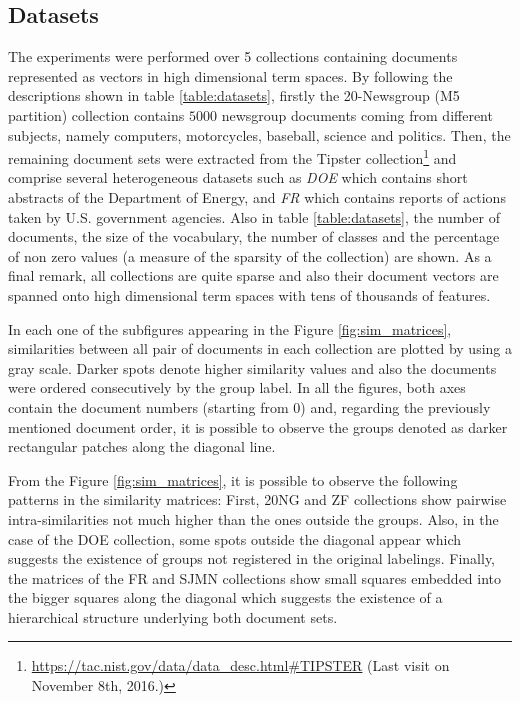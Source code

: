 \documentclass[a4paper]{article}
\begin{document}
\subsection*{Datasets}
The experiments were performed over 5 collections containing documents represented as vectors in high dimensional term spaces. By following the descriptions shown in table \ref{table:datasets}, firstly the 20-Newsgroup (M5 partition) collection contains $5000$ newsgroup documents coming from different subjects, namely computers, motorcycles, baseball, science and politics. Then, the remaining document sets were extracted from the Tipster collection\footnote{\url{https://tac.nist.gov/data/data_desc.html#TIPSTER} (Last visit on November 8th, 2016.)} and comprise several heterogeneous datasets such as \textit{DOE} which contains short abstracts of the Department of Energy, and \textit{FR} which contains reports of actions taken by U.S. government agencies.
Also in table \ref{table:datasets}, the number of documents, the size of the vocabulary, the number of classes and the percentage of non zero values (a measure of the sparsity of the collection) are shown. As a final remark, all collections are quite sparse and also their document vectors are spanned onto high dimensional term spaces with tens of thousands of features. 

In each one of the subfigures appearing in the Figure \ref{fig:sim_matrices}, similarities between all pair of documents in each collection are plotted by using a gray scale. Darker spots denote higher similarity values and also the documents were ordered consecutively by the group label. In all the figures, both axes contain the document numbers (starting from $0$) and, regarding the previously mentioned document order, it is possible to observe the groups denoted as darker rectangular patches along the diagonal line.

From the Figure \ref{fig:sim_matrices}, it is possible to observe the following patterns in the similarity matrices: 
First, 20NG and ZF collections show pairwise intra-similarities not much higher than the ones outside the groups. Also, in the case of the DOE collection, some spots outside the diagonal appear which suggests the existence of groups not registered in the original labelings.
Finally, the matrices of the FR and SJMN collections show small squares embedded into the bigger squares along the diagonal which suggests the existence of a hierarchical structure underlying both document sets.
\end{document}
